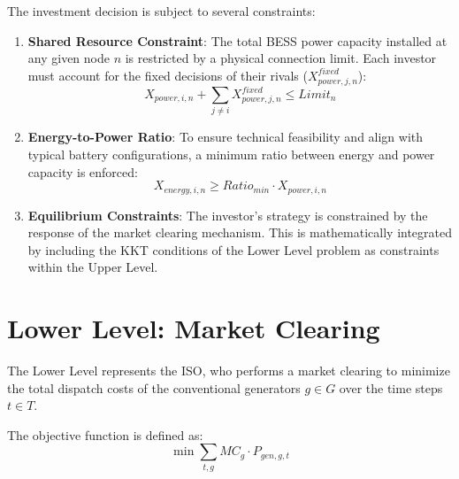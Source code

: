 The investment decision is subject to several constraints:
\begin{enumerate}
    \item \textbf{Shared Resource Constraint}: The total BESS power capacity installed at any given node \(n\) is restricted by a physical connection limit. Each investor must account for the fixed decisions of their rivals (\(X_{power,j,n}^{fixed}\)):
    \begin{equation}
        X_{power, i, n} + \sum_{j \neq i} X_{power, j, n}^{fixed} \le Limit_n
    \end{equation}
    
    \item \textbf{Energy-to-Power Ratio}: To ensure technical feasibility and align with typical battery configurations, a minimum ratio between energy and power capacity is enforced:
    \begin{equation}
             X_{energy, i, n} \ge Ratio_{min} \cdot X_{power, i, n}
    \end{equation} \label{eq:E_P_Ratio}
    
    \item \textbf{Equilibrium Constraints}: The investor's strategy is constrained by the response of the market clearing mechanism. This is mathematically integrated by including the KKT conditions of the Lower Level problem as constraints within the Upper Level.
\end{enumerate}

\section{Lower Level: Market Clearing} \label{sect:Lower_Level}
The Lower Level represents the ISO, who performs a market clearing to minimize the total dispatch costs of the conventional generators \(g\in G\) over the time steps \(t\in T\).

The objective function is defined as:
\begin{equation}
    \min \sum_{t, g} MC_g \cdot P_{gen,g, t}
\end{equation}

